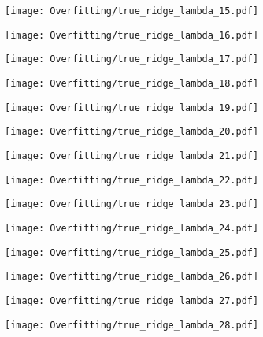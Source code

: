 \documentclass[xcolor=pdftex,dvipsnames,table]{beamer}
\begin{document}
\frame
{
	\begin{center}
		\texttt{[image: Overfitting/true\_ridge\_lambda\_15.pdf]}
	\end{center}
}
\frame
{
	\begin{center}
		\texttt{[image: Overfitting/true\_ridge\_lambda\_16.pdf]}
	\end{center}
}
\frame
{
	\begin{center}
		\texttt{[image: Overfitting/true\_ridge\_lambda\_17.pdf]}
	\end{center}
}
\frame
{
	\begin{center}
		\texttt{[image: Overfitting/true\_ridge\_lambda\_18.pdf]}
	\end{center}
}
\frame
{
	\begin{center}
		\texttt{[image: Overfitting/true\_ridge\_lambda\_19.pdf]}
	\end{center}
}
\frame
{
	\begin{center}
		\texttt{[image: Overfitting/true\_ridge\_lambda\_20.pdf]}
	\end{center}
}
\frame
{
	\begin{center}
		\texttt{[image: Overfitting/true\_ridge\_lambda\_21.pdf]}
	\end{center}
}
\frame
{
	\begin{center}
		\texttt{[image: Overfitting/true\_ridge\_lambda\_22.pdf]}
	\end{center}
}
\frame
{
	\begin{center}
		\texttt{[image: Overfitting/true\_ridge\_lambda\_23.pdf]}
	\end{center}
}
\frame
{
	\begin{center}
		\texttt{[image: Overfitting/true\_ridge\_lambda\_24.pdf]}
	\end{center}
}
\frame
{
	\begin{center}
		\texttt{[image: Overfitting/true\_ridge\_lambda\_25.pdf]}
	\end{center}
}
\frame
{
	\begin{center}
		\texttt{[image: Overfitting/true\_ridge\_lambda\_26.pdf]}
	\end{center}
}
\frame
{
	\begin{center}
		\texttt{[image: Overfitting/true\_ridge\_lambda\_27.pdf]}
	\end{center}
}
\frame
{
	\begin{center}
		\texttt{[image: Overfitting/true\_ridge\_lambda\_28.pdf]}
	\end{center}
}
\end{document}
